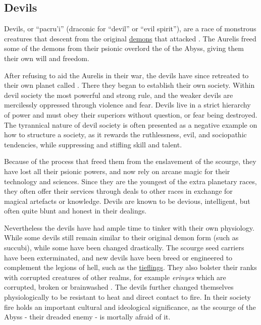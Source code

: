 \subsection{Devils}
\label{sec:Devils}

Devils, or ``pacru'i'' (draconic for ``devil'' or ``evil spirit''), are a
race of monstrous creatures that descent from the original
\hyperref[sec:Demons]{demons} that attacked . The Aurelis
freed some of the demons from their psionic overlord the 
of the Abyss, giving them their own will and freedom.

After refusing to aid the Aurelis in their war, the devils have since
retreated to their own planet called . There they began to
establish their own society. Within devil society the most powerful and strong
rule, and the weaker devils are mercilessly oppressed through violence and
fear. Devils live in a strict hierarchy of power and must obey their superiors
without question, or fear being destroyed. The tyrannical nature of devil
society is often presented as a negative example on how to structure a
society, as it rewards the ruthlessness, evil, and sociopathic tendencies,
while suppressing and stifling skill and talent.

Because of the process that freed them from the enslavement of the scourge,
they have lost all their psionic powers, and now rely on arcane magic for
their technology and sciences. Since they are the youngest of the extra
planetary races, they often offer their services through deals to other races
in exchange for magical artefacts or knowledge. Devils are known to be
devious, intelligent, but often quite blunt and honest in their dealings.

Nevertheless the devils have had ample time to tinker with their own
physiology. While some devils still remain similar to their original demon
form (such as succubi), while some have been changed drastically. The scourge
seed carriers have been exterminated, and new devils have been breed or
engineered to complement the legions of hell, such as the
\hyperref[sec:Tieflings]{tieflings}. They also bolster their ranks with
corrupted creatures of other realms, for example \emph{erinyes} which are
corrupted, broken or brainwashed . The devils further
changed themselves physiologically to be resistant to heat and direct contact
to fire. In their society fire holds an important cultural and ideological
significance, as the scourge of the Abyss - their dreaded enemy - is mortally
afraid of it.

